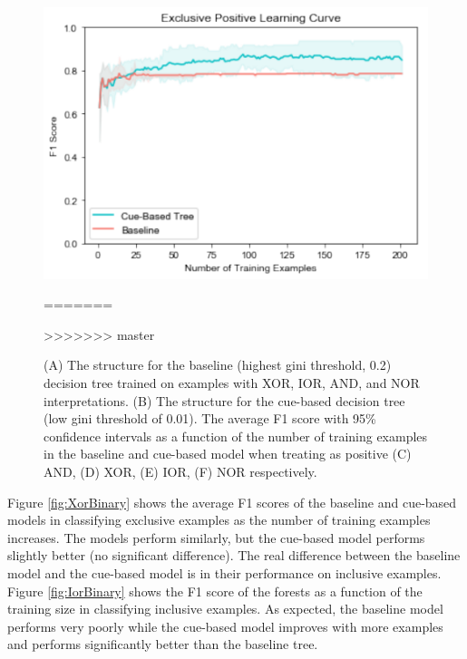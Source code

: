 \documentclass[,man,floatsintext]{apa6}
\begin{document}
\begin{figure}
\centering
\includegraphics{figs/XorBinary-1.pdf}
\caption{\label{fig:XorBinary}The average F1 score for class XOR (exclusive) as a function of the number of training examples in the baseline and cue-based models. The colored shades show the 95\% confidence intervals.}
=======
\caption{\label{fig:binaryCueBased}(A) The structure for the baseline (highest gini threshold, 0.2) decision tree trained on examples with XOR, IOR, AND, and NOR interpretations. (B) The structure for the cue-based decision tree (low gini threshold of 0.01). The average F1 score with 95\% confidence intervals as a function of the number of training examples in the baseline and cue-based model when treating as positive (C) AND, (D) XOR, (E) IOR, (F) NOR respectively.}
>>>>>>> master
\end{figure}

Figure \ref{fig:XorBinary} shows the average F1 scores of the baseline and cue-based models in classifying exclusive examples as the number of training examples increases. The models perform similarly, but the cue-based model performs slightly better (no significant difference). The real difference between the baseline model and the cue-based model is in their performance on inclusive examples. Figure \ref{fig:IorBinary} shows the F1 score of the forests as a function of the training size in classifying inclusive examples. As expected, the baseline model performs very poorly while the cue-based model improves with more examples and performs significantly better than the baseline tree.
\end{document}
